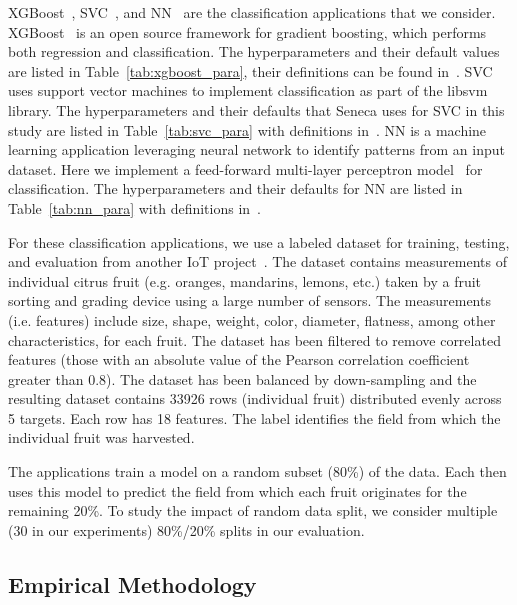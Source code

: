 XGBoost~\cite{ref:xgboost-web}, SVC~\cite{ref:svc}, and NN~\cite{ref:neural_network} 
are the classification applications that we consider.
XGBoost~\cite{ref:xgboost-web} is an open source 
framework for gradient boosting, which 
performs both regression and classification. 
The hyperparameters and their default values 
are listed in Table~\ref{tab:xgboost_para}, their definitions can be
found in~\cite{ref:xgboostparams}. SVC uses support vector machines to implement classification as part of the libsvm~\cite{ref:libsvm} library.
The hyperparameters and their defaults that Seneca uses for SVC in this study are listed in Table~\ref{tab:svc_para} with definitions
in~\cite{ref:svcparams}. NN is a machine 
learning application leveraging neural network to identify patterns from an input dataset. 
Here we implement a feed-forward multi-layer perceptron model~\cite{ref:feedforward_nn} 
for classification. The hyperparameters and their defaults for NN are listed in Table~\ref{tab:nn_para} with definitions
in~\cite{ref:nnparams}. 

For these classification applications, we use a labeled
dataset for training, testing, and evaluation from another IoT 
project~\cite{blind}. The dataset contains measurements of individual
citrus fruit (e.g. oranges, mandarins, lemons, etc.) taken by a fruit sorting
and grading device using a large number of sensors. The measurements (i.e. features) include size, shape, weight, color, diameter, flatness, among other characteristics, for each fruit.  
The dataset has been filtered to remove correlated
features (those with an absolute value of the Pearson correlation coefficient
greater than 0.8). The dataset has been balanced by 
down-sampling and the resulting 
dataset contains 33926 rows (individual fruit) 
distributed evenly across 5 targets. Each row has
18 features.  The label identifies the field from which the individual fruit was harvested.

The applications train a model on a random subset (80\%) of the data. Each then uses this model to predict the field from which each fruit originates for the remaining 20\%. To study the impact of random data split, we consider multiple (30 in our experiments) 80\%/20\% splits in our evaluation.
\subsection{Empirical Methodology}


